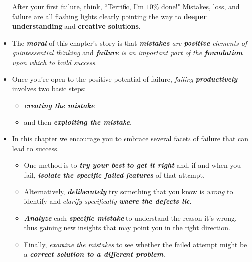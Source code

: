 \documentclass[11pt]{article}
\begin{document}
\begin{itemize}
\begin{exercise}
After your first failure, think, ``Terrific, I’m $10\%$ done!" Mistakes, loss, and failure are all flashing lights clearly pointing the way to \textbf{deeper understanding} and \textbf{creative solutions}.
\end{exercise}

\item The \emph{\textbf{moral}} of this chapter’s story is that \emph{\textbf{mistakes} are \textbf{positive} elements of quintessential thinking} and \emph{\textbf{failure} is an important part of the \textbf{foundation} upon which to build success}.

\item Once you’re open to the positive potential of failure, \emph{failing \textbf{productively}} involves two basic steps: 
\begin{itemize}
\item \textbf{\emph{creating the mistake}} 
\item and then \textbf{\emph{exploiting the mistake}}.
\end{itemize}

\item  In this chapter we encourage you to embrace several facets of failure that can lead to success.
\begin{itemize}
\item One method is to \emph{\textbf{try your best to get it right}} and, if and when you fail, \emph{\textbf{isolate the specific failed features}} of that attempt. 
\item Alternatively, \emph{\textbf{deliberately}} try something that you know is \emph{wrong} to identify and \emph{clarify specifically \textbf{where the defects lie}}. 
\item \emph{\textbf{Analyze}} each \emph{\textbf{specific mistake}} to understand the reason it’s wrong, thus gaining new insights that may point you in the right direction.
\item Finally, \emph{examine the mistakes} to see whether the failed attempt might be a \emph{\textbf{correct solution to a different problem}}.
\end{itemize}
\end{itemize}
\end{document}
